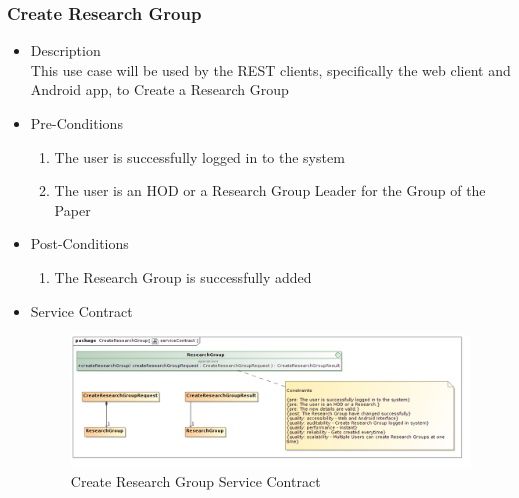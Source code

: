 \documentclass[a4paper,10pt]{article}
\begin{document}
\subsubsection{Create Research Group}
	\begin{itemize}
		\item Description\\
			This use case will be used by the REST clients, specifically the web client and Android app, to Create a Research Group
		\item Pre-Conditions
			\begin{enumerate}
				\item The user is successfully logged in to the system
				\item The user is an HOD or a Research Group Leader for the Group of the Paper
			\end{enumerate}
		\item Post-Conditions
			\begin{enumerate}
				\item The Research Group is successfully added
						
			\end{enumerate}
		\item Service Contract
			\begin{figure}[H]
				\includegraphics[scale=0.5]{createResearchGroup}
				\caption{Create Research Group Service Contract}
			\end{figure}
	\end{itemize}
\end{document}
